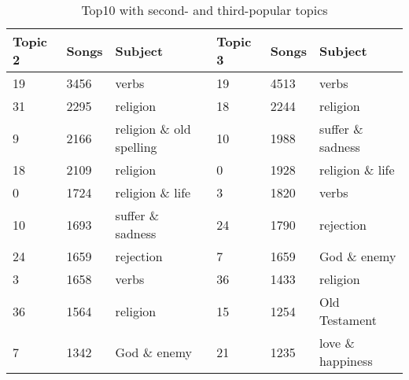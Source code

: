 \begin{table}[]
	\centering
	\begin{tabular}{lll|lll}
		\toprule
		Topic 2 & Songs & Subject & Topic 3 & Songs & Subject  \\
		\midrule
		19 & 3456 & verbs 	&	19 &   4513 & verbs \\
		31 & 2295 & religion & 18  &  2244 & religion  \\
		9 & 2166 & religion \& old spelling & 10   & 1988 & suffer \& sadness\\
		18 & 2109 & religion & 0 & 1928 & religion \& life \\
		0 & 1724 & religion \& life & 3 & 1820 & verbs \\
		10 & 1693 & suffer \& sadness & 24 & 1790 & rejection \\
		24 & 1659 & rejection & 7 & 1659 & God \& enemy \\
		3 & 1658 & verbs & 36 & 1433 & religion \\
		36 & 1564 & religion & 15 & 1254 & Old Testament \\
		7 & 1342 & God \& enemy & 21 & 1235 & love \& happiness \\
		\bottomrule      
	\end{tabular}
	\caption{Top10 with second- and third-popular topics}
	\label{table:SecondandThirdPopularTopics}
\end{table}

